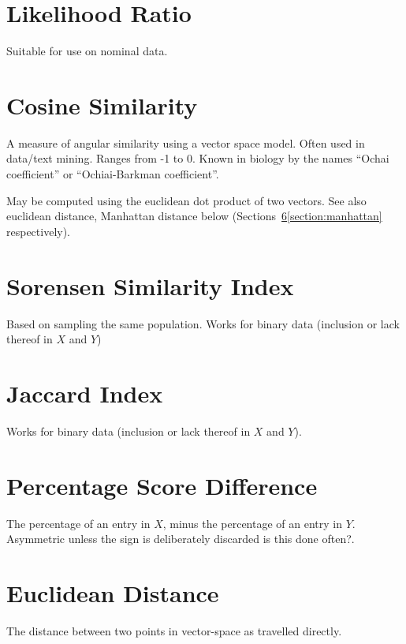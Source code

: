 \documentclass[11pt]{article}
\begin{document}
\section{Likelihood Ratio}
Suitable for use on nominal data.




\section{Cosine Similarity}
A measure of angular similarity using a vector space model.  Often used in data/text mining.  Ranges from -1 to 0.  Known in biology by the names ``Ochai coefficient'' or ``Ochiai-Barkman coefficient''.

May be computed using the euclidean dot product of two vectors.  See also euclidean distance, Manhattan distance below (Sections~\ref{section:euclid}\ref{section:manhattan} respectively).




\section{Sorensen Similarity Index}
Based on sampling the same population.  Works for binary data (inclusion or lack thereof in $X$ and $Y$)

\section{Jaccard Index}
Works for binary data (inclusion or lack thereof in $X$ and $Y$).



\section{Percentage Score Difference}
The percentage of an entry in $X$, minus the percentage of an entry in $Y$.  Asymmetric unless the sign is deliberately discarded {\color{red} is this done often?}.

\section{Euclidean Distance}
\label{section:euclid}
The distance between two points in vector-space as travelled directly.  

\end{document}
